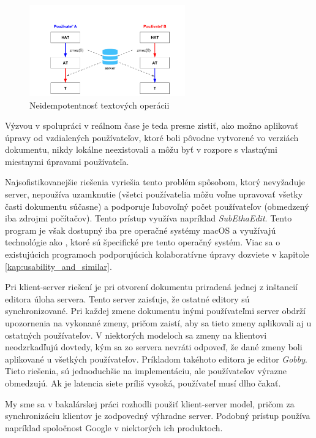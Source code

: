 \begin{figure}[H]
\centerline{\includegraphics[width=0.6\textwidth]{images/neidempotentne_operacie}}
\caption[Neidempotentnosť textových operácii]{Neidempotentnosť textových operácii}
\label{obr:neidempotentnost}
\end{figure}

Výzvou v spolupráci v reálnom čase je teda presne zistiť, ako možno aplikovať úpravy od vzdialených
používateľov, ktoré boli pôvodne vytvorené vo verziách dokumentu, nikdy lokálne neexistovali a môžu
byť v rozpore s vlastnými miestnymi úpravami používateľa. 

Najsofistikovanejšie riešenia vyriešia tento problém spôsobom, ktorý nevyžaduje server, nepoužíva
uzamknutie (všetci používatelia môžu voľne upravovať všetky časti dokumentu súčasne) a podporuje
ľubovoľný počet používateľov (obmedzený iba zdrojmi počítačov). Tento prístup využíva napríklad
\textit{SubEthaEdit}. Tento program je však dostupný iba pre operačné systémy macOS a využívajú
technológie ako \cite{bonjour}, ktoré sú špecifické pre tento operačný systém. Viac sa o
existujúcich programoch podporujúcich kolaboratívne úpravy dozviete v kapitole
\ref{kap:usability_and_similar}.

Pri klient-server riešení je pri otvorení dokumentu priradená jednej z inštancií editora
úloha servera. Tento server zaisťuje, že ostatné editory sú synchronizované. Pri každej zmene
dokumentu inými používateľmi server obdrží upozornenia na vykonané zmeny, pričom zaistí, aby
sa tieto zmeny aplikovali aj u ostatných používateľov. 
V niektorých modeloch sa zmeny na klientovi neodzrkadľujú dovtedy,
kým sa zo servera nevráti odpoveď, že dané zmeny boli aplikované u všetkých používateľov.
Príkladom takéhoto editora je editor \textit{Gobby}. Tieto riešenia, sú 
jednoduchšie na implementáciu, ale používateľov výrazne obmedzujú. Ak je latencia siete
príliš vysoká, používateľ musí dlho čakať.

My sme sa v bakalárskej práci rozhodli použiť klient-server model, pričom za synchronizáciu klientov
je zodpovedný výhradne server. Podobný prístup používa napríklad spoločnost Google v 
niektorých ich produktoch.


